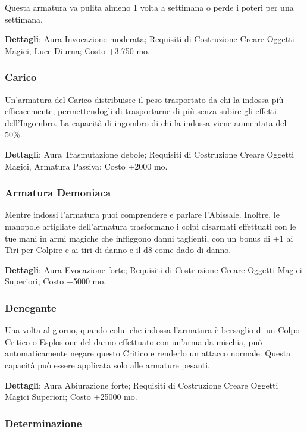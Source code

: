\begin{multicols}{2}
Questa armatura va pulita almeno 1 volta a settimana o perde i poteri per una settimana.

\textbf{Dettagli}: Aura Invocazione moderata; Requisiti di Costruzione Creare Oggetti Magici, Luce Diurna; Costo +3.750 mo.

\subsubsection*{Carico}

Un'armatura del Carico distribuisce il peso trasportato da chi la indossa più efficacemente, permettendogli di trasportarne di più senza subire gli effetti dell'Ingombro. La capacità di ingombro di chi la indossa viene aumentata del 50\%.

\textbf{Dettagli}: Aura Trasmutazione debole; Requisiti di Costruzione Creare Oggetti Magici, Armatura Passiva; Costo +2000 mo.

\subsubsection*{Armatura Demoniaca}

Mentre indossi l'armatura puoi comprendere e parlare l'Abissale. Inoltre, le manopole artigliate dell'armatura trasformano i colpi disarmati effettuati con le tue mani in armi magiche che infliggono danni taglienti, con un bonus di +1 ai Tiri per Colpire e ai tiri di danno e il d8 come dado di danno.

\textbf{Dettagli}: Aura Evocazione forte; Requisiti di Costruzione Creare Oggetti Magici Superiori; Costo +5000 mo.

\subsubsection*{Denegante}

Una volta al giorno, quando colui che indossa l'armatura è bersaglio di un Colpo Critico o Esplosione del danno effettuato con un'arma da mischia, può automaticamente negare questo Critico e renderlo un attacco normale. Questa capacità può essere applicata solo alle armature pesanti.

\textbf{Dettagli}: Aura Abiurazione forte; Requisiti di Costruzione Creare Oggetti Magici Superiori; Costo +25000 mo.

\subsubsection*{Determinazione}


\end{multicols}
